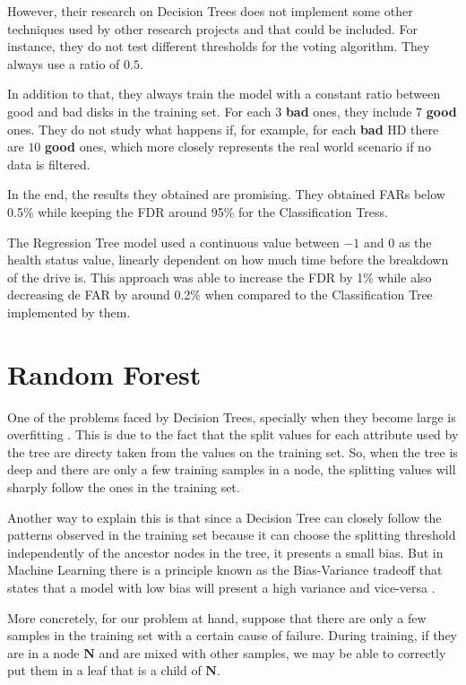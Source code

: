 However, their research on Decision Trees does not implement some other techniques used by other research projects and that could be included.
For instance, they do not test different thresholds for the voting algorithm.
They always use a ratio of $0.5$.

In addition to that, they always train the model with a constant ratio between good and bad disks in the training set.
For each $3$ \textbf{bad} ones, they include $7$ \textbf{good} ones.
They do not study what happens if, for example, for each \textbf{bad} HD there are $10$ \textbf{good} ones, which more closely represents the real world scenario if no data is filtered.

In the end, the results they obtained are promising.
They obtained FARs below 0.5\% while keeping the FDR around 95\% for the Classification Tress.

The Regression Tree model used a continuous value between $-1$ and $0$ as the health status value, linearly dependent on how much time before the breakdown of the drive is.
This approach was able to increase the FDR by 1\% while also decreasing de FAR by around 0.2\% when compared to the Classification Tree implemented by them.

\section{Random Forest}\label{sec:randomforest}

One of the problems faced by Decision Trees, specially when they become large is overfitting \cite{ying2019overview}.
This is due to the fact that the split values for each attribute used by the tree are directy taken from the values on the training set.
So, when the tree is deep and there are only a few training samples in a node, the splitting values will sharply follow the ones in the training set.

Another way to explain this is that since a Decision Tree can closely follow the patterns observed in the training set because it can choose the splitting threshold independently of the ancestor nodes in the tree, it presents a small bias.
But in Machine Learning there is a principle known as the Bias-Variance tradeoff that states that a model with low bias will present a high variance and vice-versa \cite{briscoe2011conceptual}.

More concretely, for our problem at hand, suppose that there are only a few samples in the training set with a certain cause of failure.
During training, if they are in a node $\mathbf{N}$ and are mixed with other samples, we may be able to correctly put them in a leaf that is a child of $\mathbf{N}$.

